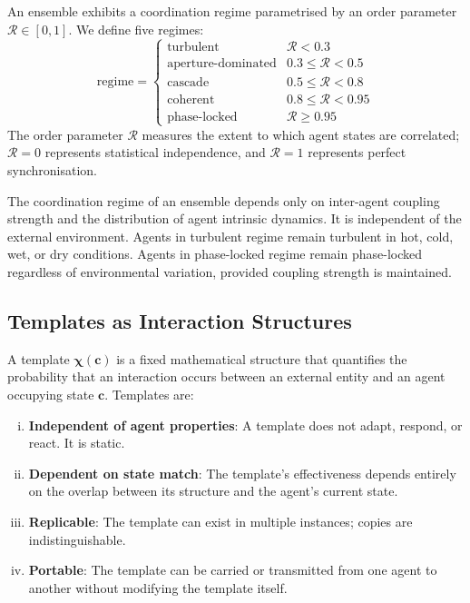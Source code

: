 \documentclass[11pt,twocolumn,a4paper]{article}
\newcommand{\Template}{\boldsymbol{\chi}}
\newcommand{\Coord}{\mathcal{R}}
\begin{document}
\begin{definition}
An ensemble exhibits a coordination regime parametrised by an order parameter $\Coord \in [0,1]$. We define five regimes:
\begin{equation}
\text{regime} = \begin{cases}
\text{turbulent} & \Coord < 0.3 \\
\text{aperture-dominated} & 0.3 \le \Coord < 0.5 \\
\text{cascade} & 0.5 \le \Coord < 0.8 \\
\text{coherent} & 0.8 \le \Coord < 0.95 \\
\text{phase-locked} & \Coord \ge 0.95
\end{cases}
\label{eq:regimes}
\end{equation}
The order parameter $\Coord$ measures the extent to which agent states are correlated; $\Coord = 0$ represents statistical independence, and $\Coord = 1$ represents perfect synchronisation.
\end{definition}

\begin{principle}
The coordination regime of an ensemble depends only on inter-agent coupling strength and the distribution of agent intrinsic dynamics. It is independent of the external environment. Agents in turbulent regime remain turbulent in hot, cold, wet, or dry conditions. Agents in phase-locked regime remain phase-locked regardless of environmental variation, provided coupling strength is maintained.
\end{principle}

\subsection{Templates as Interaction Structures}

\begin{definition}[Template]
A template $\Template(\mathbf{c})$ is a fixed mathematical structure that quantifies the probability that an interaction occurs between an external entity and an agent occupying state $\mathbf{c}$. Templates are:
\begin{enumerate}[(i)]
\item \textbf{Independent of agent properties}: A template does not adapt, respond, or react. It is static.
\item \textbf{Dependent on state match}: The template's effectiveness depends entirely on the overlap between its structure and the agent's current state.
\item \textbf{Replicable}: The template can exist in multiple instances; copies are indistinguishable.
\item \textbf{Portable}: The template can be carried or transmitted from one agent to another without modifying the template itself.
\end{enumerate}
\end{definition}
\end{document}
